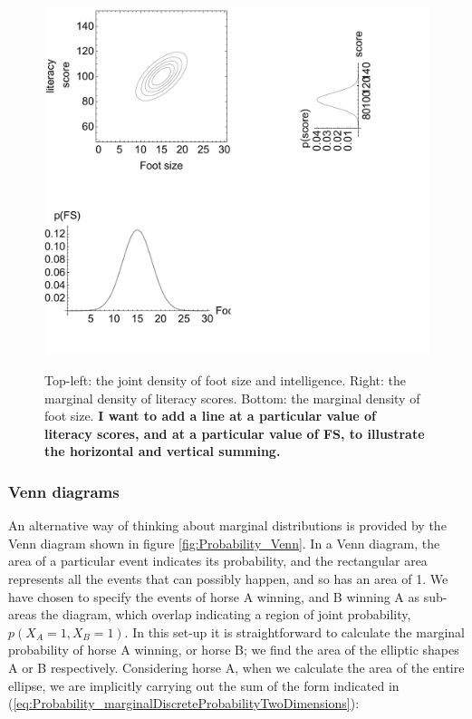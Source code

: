 \documentclass[11pt,fullpage]{book}
\begin{document}
\begin{figure}
\centering
\scalebox{0.5} 
{\includegraphics{Probability_footSizeIntelligenceMarginal.pdf}}
\caption{Top-left: the joint density of foot size and intelligence. Right: the marginal density of literacy scores. Bottom: the marginal density of foot size. \textbf{I want to add a line at a particular value of literacy scores, and at a particular value of FS, to illustrate the horizontal and vertical summing.}}\label{fig:Probability_footSizeIntelligenceMarginal}
\end{figure}

\subsubsection{Venn diagrams}
An alternative way of thinking about marginal distributions is provided by the Venn diagram shown in figure \ref{fig:Probability_Venn}. In a Venn diagram, the area of a particular event indicates its probability, and the rectangular area represents all the events that can possibly happen, and so has an area of 1. We have chosen to specify the events of horse A winning, and B winning A as sub-areas the diagram, which overlap indicating a region of joint probability, $p(X_A=1,X_B=1)$. In this set-up it is straightforward to calculate the marginal probability of horse A winning, or horse B; we find the area of the elliptic shapes A or B respectively. Considering horse A, when we calculate the area of the entire ellipse, we are implicitly carrying out the sum of the form indicated in (\ref{eq:Probability_marginalDiscreteProbabilityTwoDimensions}):
\end{document}
